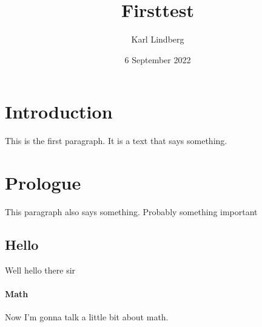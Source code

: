 \documentclass[a4paper]{article}
\title{Firsttest}
\author{Karl Lindberg}
\date{6 September 2022}
\begin{document}
\maketitle
\tableofcontents
\section{Introduction}

This is the first paragraph. It is a text that says something.

\section{Prologue}

This paragraph also says something. Probably something important

\subsection{Hello}

Well hello there sir

\paragraph{Math}

Now I'm gonna talk a little bit about math.
\end{document}
